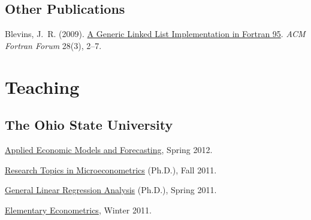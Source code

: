 \documentclass[10pt,letterpaper]{article}
\renewenvironment{itemize}{
  \begin{list}{}{
    \setlength{\leftmargin}{1.5em}
    \setlength{\itemsep}{0.25em}
    \setlength{\parskip}{0pt}
    \setlength{\parsep}{0.25em}
  }
}{
  \end{list}
}
\begin{document}
%

\subsection*{Other Publications}

\begin{itemize}

\item Blevins, J.~R. (2009).
  \href{http://jblevins.org/research/generic-list}{A Generic Linked List Implementation in Fortran 95}.
  \textit{ACM Fortran Forum} 28(3), 2--7.

\end{itemize}

\section*{Teaching}

\subsection*{The Ohio State University}

\begin{itemize}
\item \href{http://jblevins.org/courses/econ642s12/}{Applied Economic Models and Forecasting},
  Spring 2012. %
\item \href{http://jblevins.org/courses/econ843f11/}{Research Topics in Microeconometrics} (Ph.D.),
  Fall 2011. %
\item \href{http://jblevins.org/courses/econ741s11/}{General Linear Regression Analysis} (Ph.D.),
  Spring 2011. %
\item \href{http://jblevins.org/courses/econ444w11/}{Elementary Econometrics},
  Winter 2011. %
\end{itemize}
\end{document}

